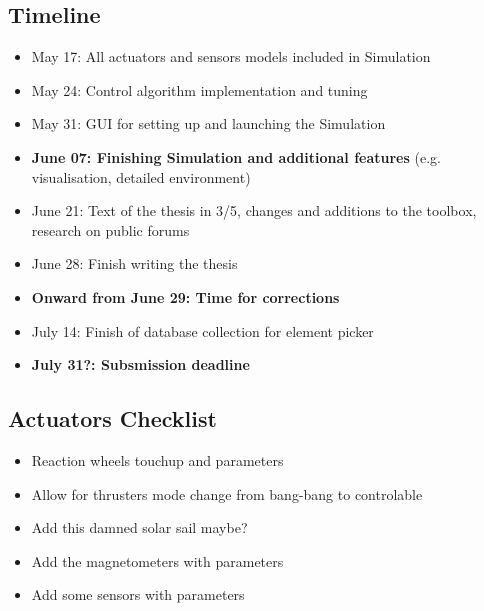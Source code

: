 \subsection*{Timeline}
\begin{itemize}
    \item May 17: All actuators and sensors models included in Simulation
    \item May 24: Control algorithm implementation and tuning
    \item May 31: GUI for setting up and launching the Simulation
    \item \textbf{June 07: Finishing Simulation and additional features} (e.g. visualisation, detailed environment)
    \item June 21: Text of the thesis in 3/5, changes and additions to the toolbox, research on public forums
    \item June 28: Finish writing the thesis
    \item \textbf{Onward from June 29: Time for corrections}
    \item July 14: Finish of database collection for element picker
    \item \textbf{July 31?: Subsmission deadline}
\end{itemize}


\subsection*{Actuators Checklist}
\begin{itemize}
    \item Reaction wheels touchup and parameters
    \item Allow for thrusters mode change from bang-bang to controlable
    \item Add this damned solar sail maybe?
    \item Add the magnetometers with parameters
    \item Add some sensors with parameters
\end{itemize}


